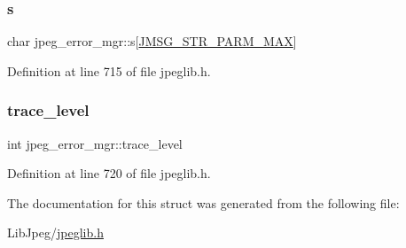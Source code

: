 \subsubsection{\texorpdfstring{s}{s}}
{\footnotesize\ttfamily char jpeg\+\_\+error\+\_\+mgr\+::s\mbox{[}\mbox{\hyperlink{jpeglib_8h_abda041041041cc3985c7bb1a32e8b0be}{J\+M\+S\+G\+\_\+\+S\+T\+R\+\_\+\+P\+A\+R\+M\+\_\+\+M\+AX}}\mbox{]}}



Definition at line 715 of file jpeglib.\+h.

\mbox{\label{structjpeg__error__mgr_a77328bf266cc3c3c4d9741fc27a4ef9b}} 
\subsubsection{\texorpdfstring{trace\_level}{trace\_level}}
{\footnotesize\ttfamily int jpeg\+\_\+error\+\_\+mgr\+::trace\+\_\+level}



Definition at line 720 of file jpeglib.\+h.



The documentation for this struct was generated from the following file\+:\begin{DoxyCompactItemize}
\item 
Lib\+Jpeg/\mbox{\hyperlink{jpeglib_8h}{jpeglib.\+h}}\end{DoxyCompactItemize}
